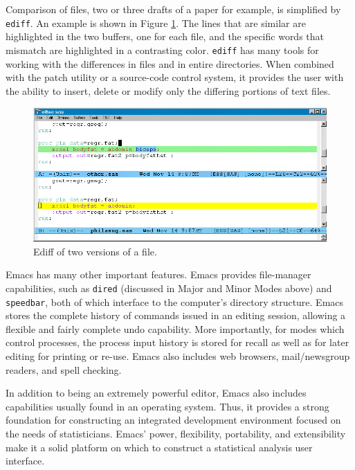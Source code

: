 \documentclass{article}
\newif\ifdraft
\newcommand{\stexttt}[1]{{\small\texttt{#1}}}
\newcommand{\emptyfig}{
\hspace*{42pt}\rule{324pt}{.25pt}\\
\hspace*{42pt}\rule{.25pt}{10pc}
\rule{316pt}{.25pt}
\rule{.25pt}{10pc}}
\begin{document}
Comparison of files, two or three drafts of a paper for example, is
simplified by \stexttt{ediff}.  An example is shown in Figure
\ref{f.ediff}.  The lines that are similar are highlighted in the two
buffers, one for each file, and the specific words that mismatch are
highlighted in a contrasting color.  \stexttt{ediff} has many tools
for working with the differences in files and in entire directories.
When combined with the patch utility or a source-code control system,
it provides the user with the ability to insert, delete or modify only
the differing portions of text files.

\begin{figure}[tbp]
  \centering
  \ifdraft
     \emptyfig
  \else
     \includegraphics[angle=270,width=\textwidth]{ediff-sas}
  \fi
  \caption{Ediff of two versions of a file.}
  \label{f.ediff}
\end{figure}

Emacs has many other important features.  Emacs provides file-manager
capabilities, such as \stexttt{dired} (discussed in Major and Minor
Modes above) and \stexttt{speedbar}, both of which interface to the
computer's directory structure.  Emacs stores the complete history of
commands issued in an editing session, allowing a flexible and fairly
complete undo capability.  More importantly, for modes which control
processes, the process input history is stored for recall as well as
for later editing for printing or re-use.  Emacs also includes web
browsers, mail/newsgroup readers, and spell checking.

In addition to being an extremely powerful editor, Emacs also
includes capabilities usually found in an operating system.  Thus, it
provides a strong foundation for constructing an integrated
development environment focused on the needs of statisticians.  Emacs'
power, flexibility, portability, and extensibility make it a solid
platform on which to construct a statistical analysis user interface.
\end{document}
